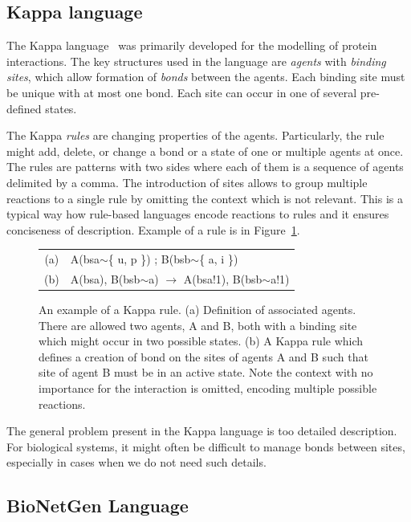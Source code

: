 \documentclass[11pt,a4paper]{report}
\begin{document}
\subsection{Kappa language}
\label{kappa}

The Kappa language~\cite{kappa_formal} was primarily developed for the modelling of protein interactions. The key structures used in the language are \emph{agents} with \emph{binding sites}, which allow formation of \emph{bonds} between the agents. Each binding site must be unique with at most one bond. Each site can occur in one of several pre-defined states.

The Kappa \emph{rules} are changing properties of the agents. Particularly, the rule might add, delete, or change a bond or a state of one or multiple agents at once. The rules are patterns with two sides where each of them is a sequence of agents delimited by a comma. The introduction of sites allows to group multiple reactions to a single rule by omitting the context which is not relevant. This is a typical way how rule-based languages encode reactions to rules and it ensures conciseness of description. Example of a rule is in Figure~\ref{kappa-rule}.

\begin{figure}[!h]
\begin{center}
\begin{tabular}{c l}
(a) & A(bsa$\sim$\{ u, p \}) ; B(bsb$\sim$\{ a, i \}) \\
(b) & A(bsa), B(bsb$\sim$a) $\rightarrow$ A(bsa!1), B(bsb$\sim$a!1) \\
\end{tabular}
\end{center}
\caption{An example of a Kappa rule. (a) Definition of associated agents. There are allowed two agents, A and B, both with a binding site which might occur in two possible states. (b) A Kappa rule which defines a creation of bond on the sites of agents A and B such that site of agent B must be in an active state. Note the context with no importance for the interaction is omitted, encoding multiple possible reactions.}\label{kappa-rule}
\end{figure}

The general problem present in the Kappa language is too detailed description. For biological systems, it might often be difficult to manage bonds between sites, especially in cases when we do not need such details.

\subsection{BioNetGen Language}
\label{bngl}
\end{document}
